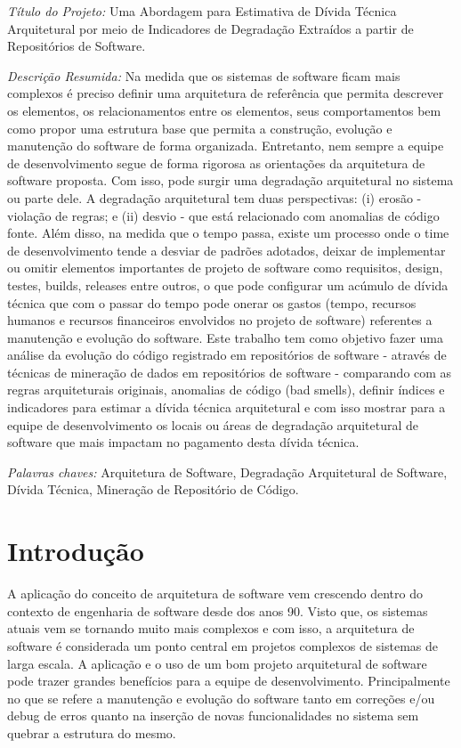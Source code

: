 \documentclass[
	12pt,				%
	openright,			%
	twoside,			%
	a4paper,			%
	english,			%
	french,				%
	spanish,			%
	brazil,				%
	]{abntex2}
\begin{document}
\emph{Título do Projeto:} Uma Abordagem para Estimativa de Dívida
Técnica Arquitetural por meio de Indicadores de Degradação Extraídos
a partir de Repositórios de Software. 

\emph{Descrição Resumida:} Na medida que os sistemas de software ficam
mais complexos é preciso definir uma arquitetura de referência que
permita descrever os elementos, os relacionamentos entre os elementos,
seus comportamentos bem como propor uma estrutura base que permita
a construção, evolução e manutenção do software de forma organizada.
Entretanto, nem sempre a equipe de desenvolvimento segue de forma
rigorosa as orientações da arquitetura de software proposta. Com isso,
pode surgir uma degradação arquitetural no sistema ou parte dele.
A degradação arquitetural tem duas perspectivas: (i) erosão - violação
de regras; e (ii) desvio - que está relacionado com anomalias de código
fonte. Além disso, na medida que o tempo passa, existe um processo
onde o time de desenvolvimento tende a desviar de padrões adotados,
deixar de implementar ou omitir elementos importantes de projeto de
software como requisitos, design, testes, builds, releases entre outros,
o que pode configurar um acúmulo de dívida técnica que com o passar
do tempo pode onerar os gastos (tempo, recursos humanos e recursos
financeiros envolvidos no projeto de software) referentes a manutenção
e evolução do software. Este trabalho tem como objetivo fazer uma
análise da evolução do código registrado em repositórios de software
- através de técnicas de mineração de dados em repositórios de software
- comparando com as regras arquiteturais originais, anomalias de código
(bad smells), definir índices e indicadores para estimar a dívida
técnica arquitetural e com isso mostrar para a equipe de desenvolvimento
os locais ou áreas de degradação arquitetural de software que mais impactam no pagamento desta dívida técnica.

\emph{Palavras chaves:} Arquitetura de Software, Degradação Arquitetural
de Software, Dívida Técnica, Mineração de Repositório de Código.

\chapter{Introdução}

A aplicação do conceito de arquitetura de software vem crescendo dentro
do contexto de engenharia de software desde dos anos 90. Visto que, os sistemas atuais vem se tornando muito mais complexos e com isso, a arquitetura de software é considerada um ponto central em projetos complexos de sistemas de larga escala. A aplicação e o uso de um bom projeto arquitetural de software pode trazer grandes benefícios para a equipe de desenvolvimento. Principalmente no que se refere a manutenção e evolução do software tanto em correções e/ou debug de erros quanto na inserção de novas funcionalidades no sistema sem quebrar a estrutura do mesmo. 
\end{document}
